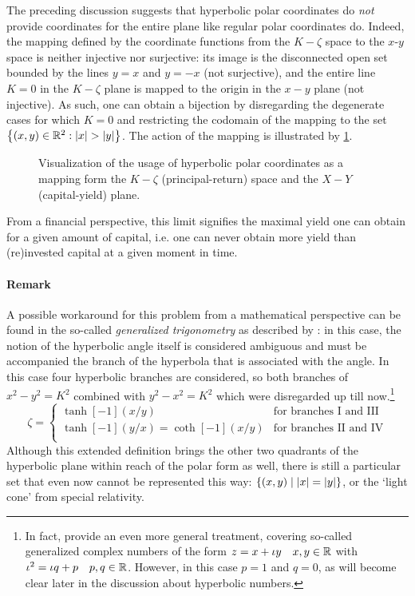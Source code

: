 The preceding discussion suggests that hyperbolic polar coordinates do \emph{not} provide coordinates for the entire plane like regular polar coordinates do. Indeed, the mapping defined by the coordinate functions from the \(K-\zeta\) space to the \(x\)-\(y\) space is neither injective nor surjective: its image is the disconnected open set bounded by the lines \(y = x\) and \(y = -x\) (not surjective), and the entire line \(K = 0\) in the \(K-\zeta\) plane is mapped to the origin in the \(x-y\) plane (not injective). As such, one can obtain a bijection by disregarding the degenerate cases for which \(K = 0\) and restricting the codomain of the mapping to the set \(\qty{(x, y) \in \real^2: \abs{x} > \abs{y}}\). The action of the mapping is illustrated by \cref{fig:polar_coords}.
\begin{figure}[ht]
    \centering
    
    \caption{Visualization of the usage of hyperbolic polar coordinates as a mapping form the $K-\zeta$ (principal-return) space and the $X-Y$ (capital-yield) plane.}
    \label{fig:polar_coords}
\end{figure}
From a financial perspective, this limit signifies the maximal yield one can obtain for a given amount of capital, i.e. one can never obtain more yield than (re)invested capital at a given moment in time.

\paragraph{Remark} A possible workaround for this problem from a mathematical perspective can be found in the so-called \emph{generalized trigonometry} as described by \citet{Harkin2004}: in this case, the notion of the hyperbolic angle itself is considered ambiguous and must be accompanied the branch of the hyperbola that is associated with the angle. In this case four hyperbolic branches are considered, so both branches of \(x^2 - y^2 = K^2\) combined with \(y^2 - x^2 = K^2\) which were disregarded up till now.\footnote{In fact, \citeauthor{Harkin2004} provide an even more general treatment, covering so-called generalized complex numbers of the form \(z = x + \iota y\quad x, y \in \mathbb{R}\) with \(\iota^2 = \iota q + p\quad p, q \in \mathbb{R}\). However, in this case \(p = 1\) and \(q = 0\), as will become clear later in the discussion about hyperbolic numbers.}
\begin{equation}
    \zeta = 
    \begin{cases}
        \tanh[-1](x/y) & \text{for branches I and III}\\
        \tanh[-1](y/x) = \coth[-1](x/y) & \text{for branches II and IV}\\
    \end{cases}
\end{equation}
Although this extended definition brings the other two quadrants of the hyperbolic plane within reach of the polar form as well, there is still a particular set that even now cannot be represented this way: \(\qty{(x, y)\mid \abs{x} = \abs{y}}\), or the `light cone' from special relativity.

